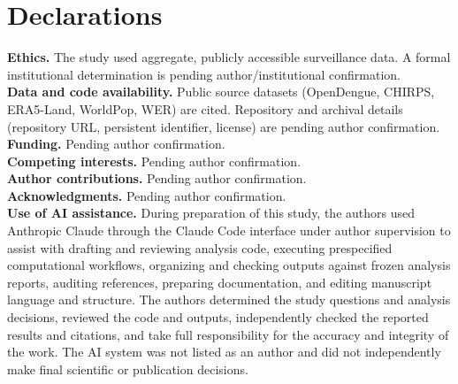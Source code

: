 \documentclass[11pt,a4paper]{article}
\begin{document}
\section*{Declarations}
\textbf{Ethics.} The study used aggregate, publicly accessible surveillance data. A formal institutional determination is pending author/institutional confirmation.\\
\textbf{Data and code availability.} Public source datasets (OpenDengue, CHIRPS, ERA5-Land, WorldPop, WER) are cited. Repository and archival details (repository URL, persistent identifier, license) are pending author confirmation.\\
\textbf{Funding.} Pending author confirmation.\\
\textbf{Competing interests.} Pending author confirmation.\\
\textbf{Author contributions.} Pending author confirmation.\\
\textbf{Acknowledgments.} Pending author confirmation.\\
\textbf{Use of AI assistance.} During preparation of this study, the authors used Anthropic Claude through the Claude Code interface under author supervision to assist with drafting and reviewing analysis code, executing prespecified computational workflows, organizing and checking outputs against frozen analysis reports, auditing references, preparing documentation, and editing manuscript language and structure. The authors determined the study questions and analysis decisions, reviewed the code and outputs, independently checked the reported results and citations, and take full responsibility for the accuracy and integrity of the work. The AI system was not listed as an author and did not independently make final scientific or publication decisions.
\end{document}
